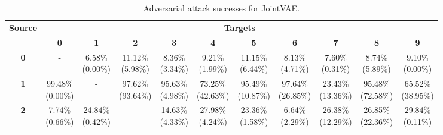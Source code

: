 \documentclass{report}
\begin{document}
\begin{table}
\caption{Adversarial attack successes for JointVAE.}\label{tab:dis-full-atck}
  \begin{tabular}{|c|c|c|c|c|c|c|c|c|c|c|}
  \cline{1-11}
  \multirow{2}{*}{\textbf{Source}}
  & \multicolumn{10}{|c|}{\textbf{Targets}}  \\ \cline {2-11}
  & \textbf{0} & \textbf{1} & \textbf{2} & \textbf{3} & \textbf{4} & \textbf{5} & \textbf{6} & \textbf{7} & \textbf{8} & \textbf{9}  \\ \hline
  \textbf{0} & - & \makecell{6.58\% \\ (0.00\%)} & \makecell{11.12\% \\ (5.98\%)} & \makecell{8.36\% \\ (3.34\%)} & \makecell{9.21\% \\ (1.99\%)} & \makecell{11.15\% \\ (6.44\%)} & \makecell{8.13\% \\ (4.71\%)} & \makecell{7.60\% \\ (0.31\%)} & \makecell{8.74\% \\ (5.89\%)} & \makecell{9.10\% \\ (0.00\%)} \\ \hline
\textbf{1} & \makecell{99.48\% \\ (0.00\%)} & - & \makecell{97.62\% \\ (93.64\%)} & \makecell{95.63\% \\ (4.98\%)} & \makecell{73.25\% \\ (42.63\%)} & \makecell{95.49\% \\ (10.87\%)} & \makecell{97.64\% \\ (26.85\%)} & \makecell{23.43\% \\ (13.36\%)} & \makecell{95.48\% \\ (72.58\%)} & \makecell{65.52\% \\ (38.95\%)} \\ \hline
\textbf{2} & \makecell{7.74\% \\ (0.66\%)} & \makecell{24.84\% \\ (0.42\%)} & - & \makecell{14.63\% \\ (4.33\%)} & \makecell{27.98\% \\ (4.24\%)} & \makecell{23.36\% \\ (1.58\%)} & \makecell{6.64\% \\ (2.29\%)} & \makecell{26.38\% \\ (12.29\%)} & \makecell{26.85\% \\ (22.36\%)} & \makecell{29.84\% \\ (0.11\%)} \\ \hline

\end{tabular}
\end{table}
\end{document}
